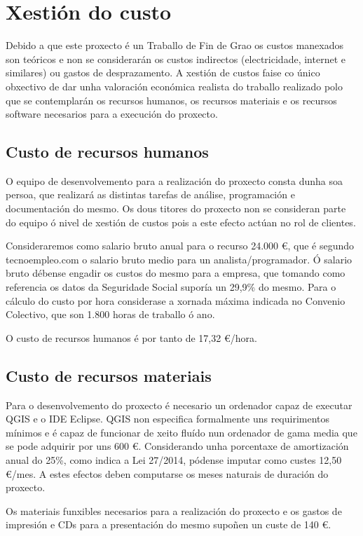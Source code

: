 \section{Xestión do custo}
Debido a que este proxecto é un Traballo de Fin de Grao os custos manexados son teóricos e non se considerarán os custos indirectos (electricidade, internet e similares) ou gastos de desprazamento. A xestión de custos faise co único obxectivo de dar unha valoración económica realista do traballo realizado polo que se contemplarán os recursos humanos, os recursos materiais e os recursos software necesarios para a execución do proxecto.

\subsection{Custo de recursos humanos}
O equipo de desenvolvemento para a realización do proxecto consta dunha soa persoa, que realizará as distintas tarefas de análise, programación e documentación do mesmo. Os dous titores do proxecto non se consideran parte do equipo ó nivel de xestión de custos pois a este efecto actúan no rol de clientes.

Consideraremos como salario bruto anual para o recurso 24.000 \euro, que é segundo tecnoempleo.com\cite{InformeSalarios} o salario bruto medio para un analista/programador. Ó salario bruto débense engadir os custos do mesmo para a empresa, que tomando como referencia os datos da Seguridade Social\cite{TabCotizacion} suporía un 29,9\% do mesmo. Para o cálculo do custo por hora considerase a xornada máxima indicada no Convenio Colectivo\cite{BOEConvenio}, que son 1.800 horas de traballo ó ano.

O custo de recursos humanos é por tanto de 17,32 \euro/hora.

\subsection{Custo de recursos materiais}
Para o desenvolvemento do proxecto é necesario un ordenador capaz de executar QGIS e o IDE Eclipse. QGIS non especifica formalmente uns requirimentos mínimos e é capaz de funcionar de xeito fluído nun ordenador de gama media que se pode adquirir por uns 600 \euro. Considerando unha porcentaxe de amortización anual do 25\%, como indica a Lei 27/2014\cite{Lei27/14}, pódense imputar como custes 12,50 \euro/mes. A estes efectos deben computarse os meses naturais de duración do proxecto.

Os materiais funxibles necesarios para a realización do proxecto e os gastos de impresión e CDs para a presentación do mesmo supoñen un custe de 140 \euro.

